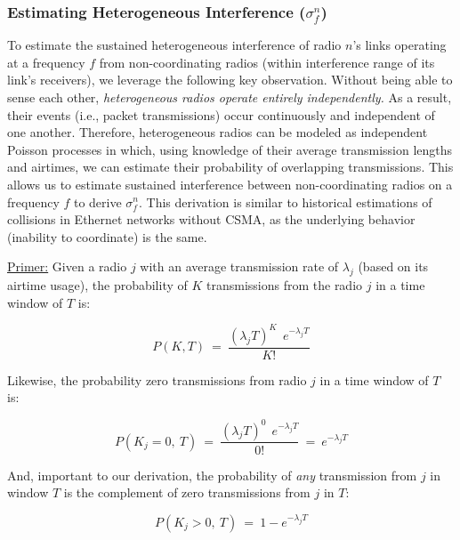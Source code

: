 \subsubsection{Estimating Heterogeneous Interference ($\sigma^n_f$)}
\label{sec:sigma}

To estimate the sustained heterogeneous interference of radio $n$'s links operating at a frequency $f$ from non-coordinating radios (within interference range of its link's receivers), we leverage the following key observation.  Without being able to sense each other, \emph{heterogeneous radios operate entirely independently.}  As a result, their events (i.e., packet transmissions) occur continuously and independent of one another.  Therefore, heterogeneous radios can be modeled as independent Poisson processes in which, using knowledge of their average transmission lengths and airtimes, we can estimate their probability of overlapping transmissions.  This allows us to estimate sustained interference between non-coordinating radios on a frequency $f$ to derive $\sigma^n_f$.  This derivation is similar to historical estimations of collisions in Ethernet networks without CSMA, as the underlying behavior (inability to coordinate) is the same.  

\vspace{0.1in}
\noindent \uline{Primer:} Given a radio $j$ with an average transmission rate of $\lambda_j$ (based on its airtime usage), the probability of $K$ transmissions from the radio $j$ in a time window of $T$ is:

\vspace{-0.15in}
\begin{equation}
\label{eq:poisson}
P(K,T)~=~\frac{(\lambda_j T)^K~~e^{- \lambda_j T}}{K!}
\end{equation}

\noindent Likewise, the probability zero transmissions from radio $j$ in a time window of $T$ is:

\vspace{-0.15in}
\begin{equation}
\label{eq:zero}
P(K_j=0,~T)~=~\frac{(\lambda_j T)^0~~e^{- \lambda_j T}}{0!}~=~e^{- \lambda_j T}
\end{equation}

\noindent And, important to our derivation, the probability of \emph{any} transmission from $j$ in window $T$ is the complement of zero transmissions from $j$ in $T$:

\vspace{-0.15in}
\begin{equation}
\label{eq:any}
P(K_j>0,~T)~=~1-e^{- \lambda_j T}
\end{equation}

